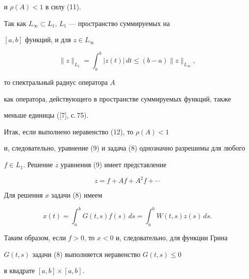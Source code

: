\begin{exam}
и $\rho(A)<1$ в силу (11).





Так как $L_\infty\subset L_1$, $L_1$ --- пространство суммируемых на


$[a,b]$ функций, и для $z\in L_\infty$


$$


\|z\|_{L_1}= \int_a^b|z(t)|\,dt\leq (b-a)\|z\|_{L_{\infty}},


$$


то спектральный радиус оператора $A$


как оператора, действующего в пространстве суммируемых функций, также


меньше единицы ([7], с.\,75).





Итак, если выполнено неравенство (12), то $\rho(A)<1$


и, следовательно, уравнение (9) и задача (8) однозначно разрешимы для любого


$f\in L_1$. Решение $z$ уравнения (9) имеет представление


$$


z= f+Af+A^2f+\dotsb


$$


Для решения $x$ задачи (8) имеем


$$


x(t)=\int_a^bG(t,s)f(s)\,ds = \int_a^b W(t,s)z(s)\,ds.


$$


Таким образом, если $f>0$, то $x<0$ и, следовательно, для функции Грина


$G(t,s)$ задачи (8) выполняется неравенство $G(t,s)\leq 0$


в квадрате $[a,b]\times[a,b]$.


\end{exam}





